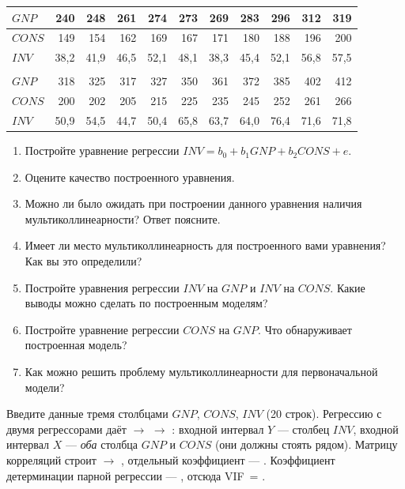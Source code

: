 \begin{center}
\small
\setlength{\tabcolsep}{4pt}
\begin{tabular}{l|*{10}{r}}
$\mathit{GNP}$  & 240 & 248 & 261 & 274 & 273 & 269 & 283 & 296 & 312 & 319 \\
\hline
$\mathit{CONS}$ & 149 & 154 & 162 & 169 & 167 & 171 & 180 & 188 & 196 & 200 \\
\hline
$\mathit{INV}$  & 38,2 & 41,9 & 46,5 & 52,1 & 48,1 & 38,3 & 45,4 & 52,1 & 56,8 & 57,5 \\
\multicolumn{11}{c}{} \\[-6pt]
$\mathit{GNP}$  & 318 & 325 & 317 & 327 & 350 & 361 & 372 & 385 & 402 & 412 \\
\hline
$\mathit{CONS}$ & 200 & 202 & 205 & 215 & 225 & 235 & 245 & 252 & 261 & 266 \\
\hline
$\mathit{INV}$  & 50,9 & 54,5 & 44,7 & 50,4 & 65,8 & 63,7 & 64,0 & 76,4 & 71,6 & 71,8 \\
\end{tabular}
\end{center}

\begin{enumerate}[label=\asbuk*), leftmargin=2.2em, itemsep=3pt]
  \item Постройте уравнение регрессии
        $\mathit{INV} = b_0 + b_1\mathit{GNP} + b_2\mathit{CONS} + e$.
  \item Оцените качество построенного уравнения.
  \item Можно ли было ожидать при построении данного уравнения наличия
        мультиколлинеарности? Ответ поясните.
  \item Имеет ли место мультиколлинеарность для построенного вами уравнения?
        Как вы это определили?
  \item Постройте уравнения регрессии $\mathit{INV}$ на $\mathit{GNP}$ и
        $\mathit{INV}$ на $\mathit{CONS}$. Какие выводы можно сделать по
        построенным моделям?
  \item Постройте уравнение регрессии $\mathit{CONS}$ на $\mathit{GNP}$. Что
        обнаруживает построенная модель?
  \item Как можно решить проблему мультиколлинеарности для первоначальной
        модели?
\end{enumerate}

\begin{excel}
Введите данные тремя столбцами $\mathit{GNP}$, $\mathit{CONS}$, $\mathit{INV}$
(20 строк). Регрессию с двумя регрессорами даёт  $\to$
 $\to$ : входной интервал $Y$ — столбец
$\mathit{INV}$, входной интервал $X$ — \emph{оба} столбца $\mathit{GNP}$ и
$\mathit{CONS}$ (они должны стоять рядом). Матрицу корреляций строит
 $\to$ , отдельный коэффициент —
. Коэффициент детерминации парной регрессии — ,
отсюда VIF~= .
\end{excel}

